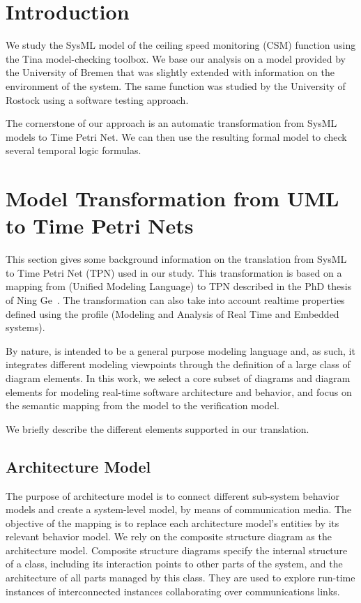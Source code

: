 
\section{Introduction}
\label{sec:intro}

We study the SysML model of the ceiling speed monitoring (CSM)
function using the Tina model-checking toolbox. We base our analysis
on a model provided by the University of Bremen that was slightly
extended with information on the environment of the system. The same
function was studied by the University of Rostock using a software
testing approach.

The cornerstone of our approach is an automatic transformation from
SysML models to Time Petri Net. We can then use the resulting formal
model to check several temporal logic formulas.


\section{Model Transformation from UML to Time Petri Nets}
\label{sec:uml}

This section gives some background information on the translation from
SysML to Time Petri Net (TPN) used in our study. This transformation
is based on a mapping from \uml (Unified Modeling Language) to TPN
described in the PhD thesis of Ning Ge~\cite{Ge2014}. The
transformation can also take into account realtime properties defined
using the \marte profile (Modeling and Analysis of Real Time and
Embedded systems).

By nature, \uml is intended to be a general purpose modeling language
and, as such, it integrates different modeling viewpoints through the
definition of a large class of diagram elements. In this work, we
select a core subset of \uml diagrams and diagram elements for
modeling real-time software architecture and behavior, and focus on
the semantic mapping from the \uml model to the verification model.

We briefly describe the different elements supported in our
translation.

\subsection{Architecture Model}
The purpose of architecture model is to connect different sub-system
behavior models and create a system-level model, by means of
communication media. The objective of the mapping is to replace each
architecture model's entities by its relevant behavior model.  We rely
on the composite structure diagram as the architecture model.
Composite structure diagrams specify the internal structure of a
class, including its interaction points to other parts of the system,
and the architecture of all parts managed by this class. They are used
to explore run-time instances of interconnected instances
collaborating over communications links.

